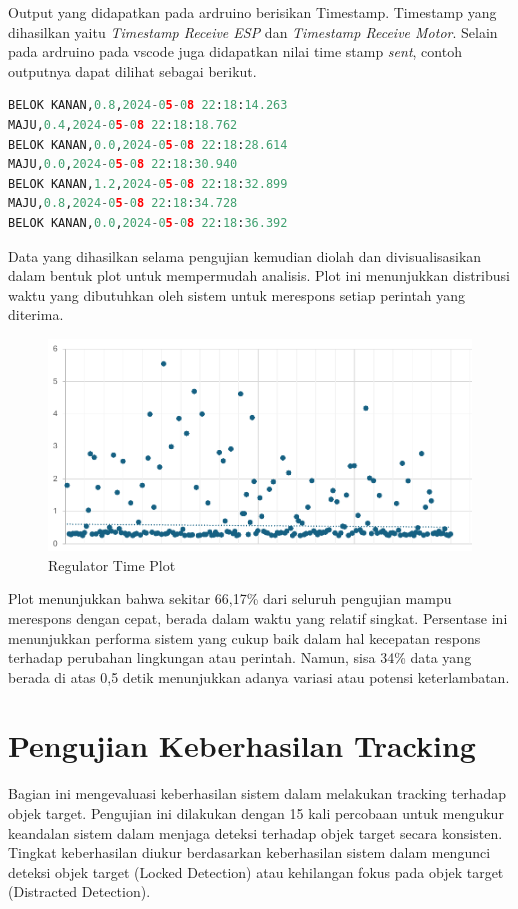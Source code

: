 Output yang didapatkan pada ardruino berisikan Timestamp. Timestamp yang dihasilkan yaitu \emph{Timestamp Receive ESP} dan \emph{Timestamp Receive Motor}. Selain pada ardruino pada vscode juga didapatkan nilai time stamp \emph{sent}, contoh outputnya dapat dilihat sebagai berikut.

\begin{lstlisting}[language=python]
BELOK KANAN,0.8,2024-05-08 22:18:14.263
MAJU,0.4,2024-05-08 22:18:18.762
BELOK KANAN,0.0,2024-05-08 22:18:28.614
MAJU,0.0,2024-05-08 22:18:30.940
BELOK KANAN,1.2,2024-05-08 22:18:32.899
MAJU,0.8,2024-05-08 22:18:34.728
BELOK KANAN,0.0,2024-05-08 22:18:36.392
\end{lstlisting}

Data yang dihasilkan selama pengujian kemudian diolah dan divisualisasikan dalam bentuk plot untuk mempermudah analisis. Plot ini menunjukkan distribusi waktu yang dibutuhkan oleh sistem untuk merespons setiap perintah yang diterima.

\begin{figure}[H]
    \centering
    \includegraphics[width=.6\textwidth]{gambar/tex/plot.pdf}
    \caption{Regulator Time Plot}
    \label{fig:regulator_time_plot}
\end{figure}

Plot menunjukkan bahwa sekitar 66,17\% dari seluruh pengujian mampu merespons dengan cepat, berada dalam waktu yang relatif singkat.
Persentase ini menunjukkan performa sistem yang cukup baik dalam hal kecepatan respons terhadap perubahan lingkungan atau perintah. Namun, sisa 34\% data yang berada di atas 0,5 detik menunjukkan adanya variasi atau potensi keterlambatan.

\newpage
\section{Pengujian Keberhasilan Tracking}
\label{sec:pengujiankeberhasiltracking}

Bagian ini mengevaluasi keberhasilan sistem dalam melakukan tracking terhadap objek target. Pengujian ini dilakukan dengan 15 kali percobaan untuk mengukur keandalan sistem dalam menjaga deteksi terhadap objek target secara konsisten. Tingkat keberhasilan diukur berdasarkan keberhasilan sistem dalam mengunci deteksi objek target (Locked Detection) atau kehilangan fokus pada objek target (Distracted Detection).

